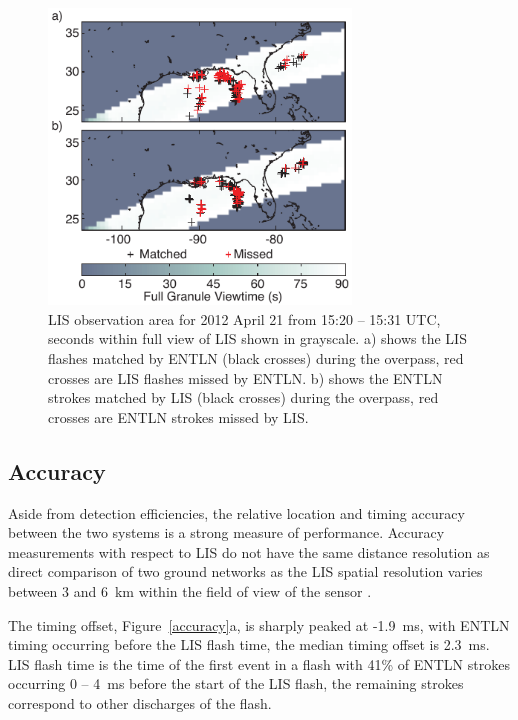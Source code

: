 \begin{figure}[t]
   \centering
   \noindent\includegraphics[width=19pc,angle=0]{entln_lis/Figures/overpass.pdf}
   \caption{LIS observation area for 2012 April 21 from 15:20 -- 15:31 UTC, seconds within full view of LIS shown in grayscale.
      		a) shows the LIS flashes matched by ENTLN (black crosses) during the overpass, red crosses are LIS flashes missed by ENTLN.
		b) shows the ENTLN strokes matched by LIS (black crosses) during the overpass, red crosses are ENTLN strokes missed by LIS.
		}
   \label{overpass}
\end{figure}

\subsection{Accuracy}

Aside from detection efficiencies, the relative location and timing accuracy between the two systems is a strong measure of performance.
Accuracy measurements with respect to LIS do not have the same distance resolution as direct comparison of two ground networks as the LIS spatial resolution varies between 3 and 6~km within the field of view of the sensor \citep{Christian1999}.

The timing offset, Figure~\ref{accuracy}a, is sharply peaked at -1.9~ms, with ENTLN timing occurring before the LIS flash time, the median timing offset is 2.3~ms.
LIS flash time is the time of the first event in a flash with 41\% of ENTLN strokes occurring 0 -- 4~ms before the start of the LIS flash, the remaining strokes correspond to other discharges of the flash.

